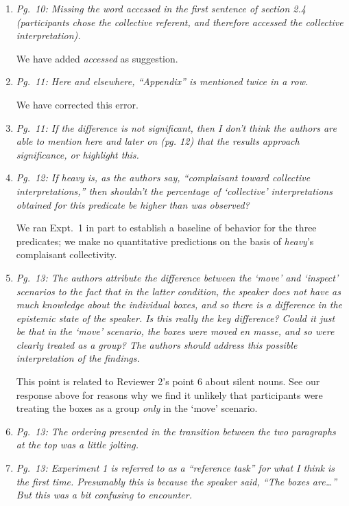 \documentclass[12pt]{article}
\begin{document}
\begin{enumerate}
\item \emph{Pg.~10: Missing the word \emph{accessed} in the first sentence of section 2.4 (\emph{participants chose the collective referent, and therefore accessed the collective interpretation}).}

We have added \emph{accessed} as suggestion.

\item \emph{Pg.~11: Here and elsewhere, ``Appendix'' is mentioned twice in a row.}

We have corrected this error.

\item \emph{Pg.~11: If the difference is not significant, then I don't think the authors are able to mention here and later on (pg. 12) that the results approach significance, or highlight this.}



\item \emph{Pg.~12: If \emph{heavy} is, as the authors say, ``complaisant toward collective interpretations,'' then shouldn't the percentage of `collective' interpretations obtained for this predicate be higher than was observed?}

We ran Expt.~1 in part to establish a baseline of behavior for the three predicates; we make no quantitative predictions on the basis of \emph{heavy}'s complaisant collectivity.

\item \emph{Pg.~13: The authors attribute the difference between the `move' and `inspect' scenarios to the fact that in the latter condition, the speaker does not have as much knowledge about the individual boxes, and so there is a difference in the epistemic state of the speaker. Is this really the key difference? Could it just be that in the `move' scenario, the boxes were moved en masse, and so were clearly treated as a group? The authors should address this possible interpretation of the findings.}

This point is related to Reviewer 2's point 6 about silent nouns. See our response above for reasons why we find it unlikely that participants were treating the boxes as a group \emph{only} in the `move' scenario.

\item \emph{Pg.~13: The ordering presented in the transition between the two paragraphs at the top was a little jolting.} 
	
\item \emph{Pg.~13: Experiment 1 is referred to as a ``reference task'' for what I think is the first time. Presumably this is because the speaker said, ``The boxes are\ldots'' But this was a bit confusing to encounter.}


\end{enumerate}
\end{document}

